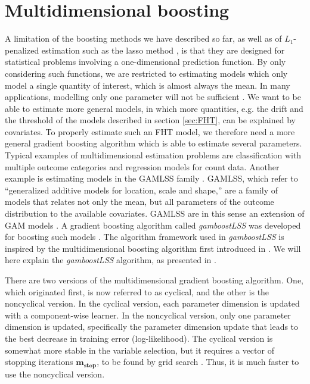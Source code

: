 \section{Multidimensional boosting}
A limitation of the boosting methods we have described so far, as well as of $L_1$-penalized estimation such as the lasso method \citep{lasso}, is that they are designed for statistical problems involving a one-dimensional prediction function.
By only considering such functions, we are restricted to estimating models which only model a single quantity of interest, which is almost always the mean.
In many applications, modelling only one parameter will not be sufficient \citep{kneib2013}.
We want to be able to estimate more general models, in which more quantities, e.g. the drift and the threshold of the models described in section \ref{sec:FHT}, can be explained by covariates.
To properly estimate such an FHT model, we therefore need a more general gradient boosting algorithm which is able to estimate several parameters.
Typical examples of multidimensional estimation problems are classification with multiple outcome categories and regression models for count data.
Another example is estimating models in the GAMLSS family \citep{gamlss}.
GAMLSS, which refer to ``generalized additive models for location, scale and shape,'' are a family of models that relates not only the mean, but all parameters of the outcome distribution to the available covariates.
GAMLSS are in this sense an extension of GAM models \citep{gam-book}.
A gradient boosting algorithm called \textit{gamboostLSS} was developed for boosting such models \citep{gamboostlss-paper}.
The algorithm framework used in \textit{gamboostLSS} is inspired by the multidimensional boosting algorithm first introduced in \citet{schmid}.
We will here explain the \textit{gamboostLSS} algorithm, as presented in \citet{gamboostlss-paper}.

There are two versions of the multidimensional gradient boosting algorithm.
One, which originated first, is now referred to as cyclical, and the other is the noncyclical version.
In the cyclical version, each parameter dimension is updated with a component-wise learner.
In the noncyclical version, only one parameter dimension is updated, specifically the parameter dimension update that leads to the best decrease in training error (log-likelihood).
The cyclical version is somewhat more stable in the variable selection, but it requires a vector of stopping iterations $\boldsymbol{m_{\text{stop}}}$, to be found by grid search \citep{thomas2018}.
Thus, it is much faster to use the noncyclical version.

